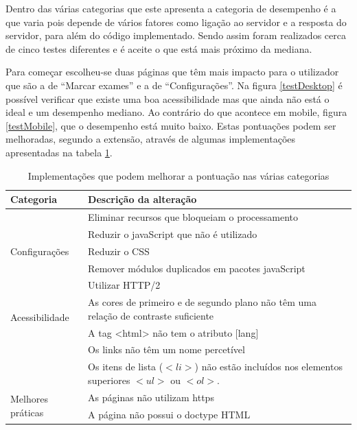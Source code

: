 \documentclass[11pt, twoside]{report}
\begin{document}
	Dentro das várias categorias que este apresenta a categoria de desempenho é a que varia pois depende de vários fatores como ligação ao servidor e a resposta do servidor, para além do código implementado. Sendo assim foram realizados cerca de cinco testes diferentes e é aceite o que está mais próximo da mediana. 
	
	Para começar escolheu-se duas páginas que têm mais impacto para o utilizador que são a de ``Marcar exames'' e a de ``Configurações''.
	Na figura \ref{testDesktop} é possível verificar que existe uma boa acessibilidade mas que ainda não está o ideal e um desempenho mediano.
	Ao contrário do que acontece em mobile, figura \ref{testMobile}, que o desempenho está muito baixo. Estas pontuações podem ser melhoradas, segundo a extensão, através de algumas implementações apresentadas na tabela \ref{upScoreTesting}.
	
		\begin{center}

		\begin{longtable}[H]{|m{2.2cm}|m{12cm}|}
			\caption{Implementações que podem melhorar a pontuação nas várias categorias}
			\label{upScoreTesting}\\
			\hline			
			\textbf{Categoria}&\textbf{Descrição da alteração} \\
			\hline
			
			\multirow{5}{2cm}{Configurações}& Eliminar recursos que bloqueiam o processamento \\
			
			& Reduzir o javaScript que não é utilizado \\
			
			&Reduzir o CSS \\
			
			&Remover módulos duplicados em pacotes javaScript\\
			
			&Utilizar HTTP/2\\
			\hline
			\multirow{2}{2cm}{Acessibilidade}& As cores de primeiro e de segundo plano não têm uma relação de contraste suficiente \\
			&A tag <html> não tem o atributo [lang]\\
			&Os links não têm um nome percetível\\
			&Os itens de lista ($<li>$) não estão incluídos nos elementos superiores $<ul>$ ou $<ol>$.\\
			\hline
			\multirow{2}{2cm}{Melhores práticas} & As páginas não utilizam https\\
			&A página não possui o doctype HTML\\
			\hline
		\end{longtable}

	\end{center}
\end{document}
